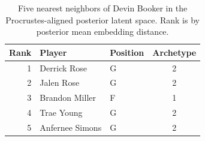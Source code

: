 \begin{table}[htbp]
  \centering\small
  \begin{tabular}{rllc}
    \toprule
    Rank & Player & Position & Archetype \\
    \midrule
    1 & Derrick Rose & G & 2 \\
    2 & Jalen Rose & G & 2 \\
    3 & Brandon Miller & F & 1 \\
    4 & Trae Young & G & 2 \\
    5 & Anfernee Simons & G & 2 \\
    \bottomrule
  \end{tabular}
  \caption{Five nearest neighbors of Devin Booker in the Procrustes-aligned posterior latent space. Rank is by posterior mean embedding distance.}
  \label{tab:Devin_Booker_neighbors}
\end{table}

